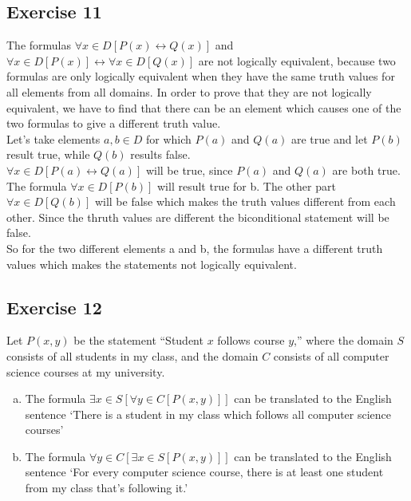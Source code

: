 \documentclass[a4paper]{article}
\newcommand{\exercise}[2]{\subsection*{Exercise #1}{#2}}
\begin{document}
\exercise{11}{%
The formulas
$\forall x\in D \left[ P (x) \leftrightarrow Q(x)\right]$
and
$  \forall x\in D \left[P (x)\right]
\leftrightarrow
   \forall x\in D \left[Q(x)\right]
$
are not logically equivalent,
because two formulas are only logically equivalent when they have the same truth values for all elements from all domains. In order to prove that they are not logically equivalent, we have to find that there can be an element which causes one of the two formulas to give a different truth value. \\
Let's take elements $a, b \in D$ for which $P(a)$ and $Q(a)$ are true and let $P(b)$ result true, while $Q(b)$ results false. \\
$\forall x\in D \left[ P(a) \leftrightarrow Q(a)\right]$ will be true, since $P(a)$ and $Q(a)$ are both true.
The formula $\forall x\in D \left[P (b)\right]$ will result true for b. The other part $\forall x\in D \left[Q(b)\right]$ will be false which makes the truth values different from each other. Since the thruth values are different the biconditional statement will be false. \\
So for the two different elements a and b, the formulas have a different truth values which makes the statements not logically equivalent.
}

\exercise{12}{%
Let $P(x, y)$ be the statement ``Student $x$ follows course $y$,''
where the domain $S$ consists of all students in my class,
and the domain $C$ consists of all computer science courses
at my university.
\begin{enumerate}[a)]
\addtocounter{enumi}{1}
\item%
The formula
$\exists x\in S\left[\forall y\in C\left[P(x, y)\right]\right]$
can be translated to the English sentence
`There is a student in my class which follows all computer science courses'
\addtocounter{enumi}{2}
\item%
The formula
$\forall y\in C\left[\exists x\in S\left[P(x, y)\right]\right]$
can be translated to the English sentence
`For every computer science course, there is at least one student from my class that's following it.'
\end{enumerate}
}
\end{document}
